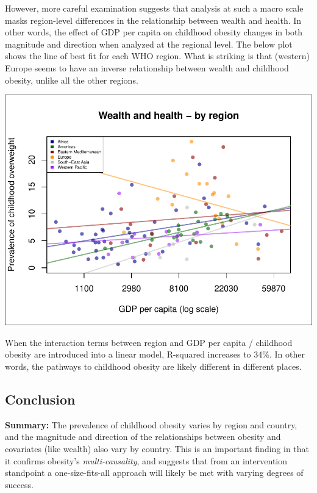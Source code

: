 \documentclass[11pt]{article}
\begin{document}
\begin{multicols}{2}
However, more careful examination suggests that analysis at such a macro scale masks region-level differences in the relationship between wealth and health.  In other words, the effect of GDP per capita on childhood obesity changes in both magnitude and direction when analyzed at the regional level.  The below plot shows the line of best fit for each WHO region.  What is striking is that (western) Europe seems to have an inverse relationship between wealth and childhood obesity, unlike all the other regions.      \\

\begin{center}
\includegraphics{global_variance-009}
\end{center}

When the interaction terms between region and GDP per capita / childhood obesity are introduced into a linear model, R-squared increases to 34\%.  In other words, the pathways to childhood obesity are likely different in different places.

\subsection*{Conclusion}

\noindent \textbf{Summary:} The prevalence of childhood obesity varies by region and country, and the magnitude and direction of the relationships between obesity and covariates (like wealth) also vary by country.  This is an important finding in that it confirms obesity's \emph{multi-causality}, and suggests that from an intervention standpoint a one-size-fits-all approach will likely be met with varying degrees of success. \\


\end{multicols}
\end{document}
